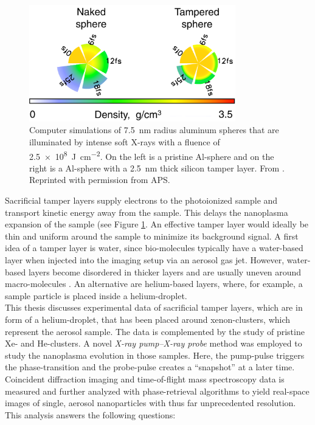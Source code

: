 %
\begin{figure}
	\centering
		\includegraphics[width=0.80\textwidth]{images/tamper-layer.png}
	\caption[Computer simulations of \SI{7.5}{\nano\meter} radius aluminum spheres with tamper layers]{Computer simulations of \SI{7.5}{\nano\meter} radius aluminum spheres that are illuminated by intense soft X-rays with a fluence of \SI{2.5e8}{\joule\per\square\centi\meter}. On the left is a pristine Al-sphere and on the right is a Al-sphere with a \SI{2.5}{\nano\meter} thick silicon tamper layer. From \citep{Hau-Riege-2010-PRL}. Reprinted with permission from APS.}
	\label{fig:tamper-layer}
\end{figure}
%
Sacrificial tamper layers supply electrons to the photoionized sample and transport kinetic energy away from the sample. This delays the nanoplasma expansion of the sample (see Figure \ref{fig:tamper-layer}. An effective tamper layer would ideally be thin and uniform around the sample to minimize its background signal. A first idea of a tamper layer is water, since bio-molecules typically have a water-based layer when injected into the imaging setup via an aerosol gas jet. However, water-based layers become disordered in thicker layers and are usually uneven around macro-molecules \citep{Aquila-2015-StrucDyn}. An alternative are helium-based layers, where, for example, a sample particle is placed inside a helium-droplet.\\[1\baselineskip]
%
This thesis discusses experimental data of sacrificial tamper layers, which are in form of a helium-droplet, that has been placed around xenon-clusters, which represent the aerosol sample. The data is complemented by the study of pristine Xe- and He-clusters. A novel \textit{X-ray pump--X-ray probe} method was employed to study the nanoplasma evolution in those samples. Here, the pump-pulse triggers the phase-transition and the probe-pulse creates a ``snapshot'' at a later time. Coincident diffraction imaging and time-of-flight mass spectroscopy data is measured and further analyzed with phase-retrieval algorithms to yield real-space images of single, aerosol nanoparticles with thus far unprecedented resolution. This analysis answers the following questions:

